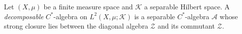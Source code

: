 Let $(X, \mu)$ be a finite measure space and $\mathcal{K}$ a separable Hilbert space. A \emph{decomposable} $C^*$-algebra on $L^2(X, \mu; \mathcal{K})$ is a separable $C^*$-algebra $\mathcal{A}$ whose strong closure lies between the diagonal algebra $\mathcal{Z}$ and its commutant $\mathcal{Z}$.
